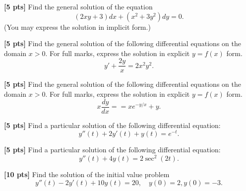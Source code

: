 \documentclass[11pt]{article}
\begin{document}
\begin{problem}
\textbf{[5 pts]} Find the general solution of the equation 
\begin{equation*}
 (2xy + 3)dx + (x ^{2} + 3y ^{2} )dy = 0.
\end{equation*}
(You may express the solution in implicit form.)
\end{problem}



\begin{problem}
\textbf{[5 pts]} Find the general solution of the following differential equations on the domain $x > 0$. For full marks, express the solution in explicit $y = f (x)$ form.
\begin{equation*}
 y' + \frac{2y}{ x} = 2x ^{2} y ^{2}.
\end{equation*}
\end{problem}



\begin{problem}
\textbf{[5 pts]} Find the general solution of the following differential equations on the domain $x > 0$. For full marks, express the solution in explicit $y = f (x)$ form.
\begin{equation*}
 x\frac{dy}{dx} = = xe ^{−y/x} + y.
\end{equation*}
\end{problem}



\begin{problem}
\textbf{[5 pts]} Find a particular solution of the following differential equation:
\begin{equation*}
 y'' (t) + 2y' (t) + y(t) = e ^{−t} .
\end{equation*}
\end{problem}



\begin{problem}
\textbf{[5 pts]} Find a particular solution of the following differential equation:
\begin{equation*}
 y'' (t) + 4y(t) = 2 \sec ^{2} (2t).
\end{equation*}
\end{problem}



\begin{problem}
\textbf{[10 pts]} Find the solution of the initial value problem
\begin{equation*}
 y'' (t) − 2y' (t) + 10y(t) = 20,\quad  y(0) = 2, y (0) = −3.
\end{equation*}
\end{problem}
\end{document}

